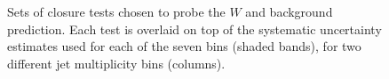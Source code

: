 \begin{figure}[h!]
  \begin{center}
     \\
     ~~
     \\
    \caption{Sets of closure tests chosen to probe the $W$ and \ttbar
      background prediction. Each test is overlaid on top of
      the systematic uncertainty estimates used for each of the seven
      \scalht bins (shaded bands), for two different jet
      multiplicity bins (columns).}
    \label{fig:ttWClosure}
  \end{center} 
\end{figure}

